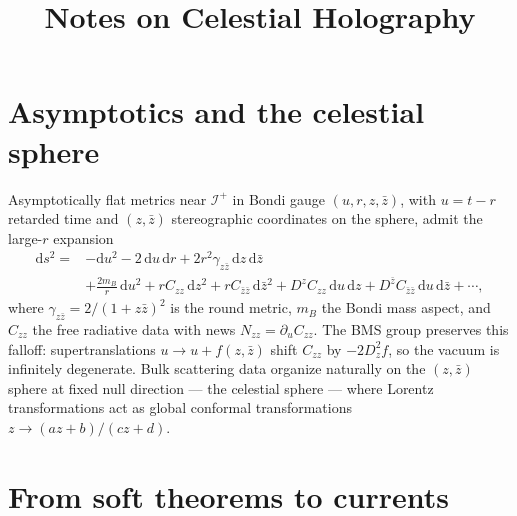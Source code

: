 \documentclass[11pt]{article}
\title{Notes on Celestial Holography}
\author{}
\date{}
\newcommand{\dd}{\mathrm{d}}
\begin{document}
\maketitle

\section{Asymptotics and the celestial sphere}

Asymptotically flat metrics near $\mathscr{I}^+$ in Bondi gauge
$(u,r,z,\bar z)$, with $u=t-r$ retarded time and $(z,\bar z)$
stereographic coordinates on the sphere, admit the large-$r$ expansion
\begin{equation}
\begin{aligned}
\dd s^2 = {}& -\dd u^2 - 2\,\dd u\,\dd r
  + 2 r^2 \gamma_{z\bar z}\,\dd z\,\dd\bar z \\
& + \frac{2 m_B}{r}\,\dd u^2
  + r C_{zz}\,\dd z^2 + r C_{\bar z\bar z}\,\dd\bar z^2
  + D^z C_{zz}\,\dd u\,\dd z + D^{\bar z} C_{\bar z\bar z}\,\dd u\,\dd\bar z
  + \cdots,
\end{aligned}
\label{eq:bondi}
\end{equation}
where $\gamma_{z\bar z} = 2/(1+z\bar z)^2$ is the round metric, $m_B$
the Bondi mass aspect, and $C_{zz}$ the free radiative data with news
$N_{zz} = \partial_u C_{zz}$. The BMS group preserves this falloff:
supertranslations $u \to u + f(z,\bar z)$ shift $C_{zz}$ by
$-2 D_z^2 f$, so the vacuum is infinitely degenerate. Bulk scattering
data organize naturally on the $(z,\bar z)$ sphere at fixed null
direction --- the celestial sphere --- where Lorentz transformations act
as global conformal transformations $z \to (az+b)/(cz+d)$.

\section{From soft theorems to currents}
\end{document}
